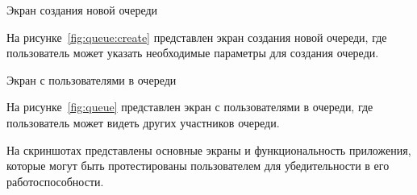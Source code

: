 \begin{image}
    \caption{Экран создания новой очереди}
    \label{fig:queue:create}
\end{image}

На рисунке~\ref{fig:queue:create} представлен экран создания новой очереди,
где пользователь может указать необходимые параметры для создания очереди.

\begin{image}
    \caption{Экран с пользователями в очереди}
    \label{fig:queue}
\end{image}

На рисунке~\ref{fig:queue} представлен экран с пользователями в очереди,
где пользователь может видеть других участников очереди.


На скриншотах представлены основные экраны и функциональность приложения,
которые могут быть протестированы пользователем для убедительности
в его работоспособности.

